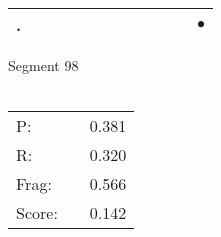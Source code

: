 \documentclass[landscape]{article}
\newcommand{\ssp}{\hspace{2pt}}
\newcommand{\mex}{\cellcolor{g}$\bullet$}
\begin{document}
\begin{tabular}{|l|p{10pt}|p{10pt}|p{10pt}|p{10pt}|p{10pt}|p{10pt}|p{10pt}|p{10pt}|p{10pt}|p{10pt}|p{10pt}|}
\hline
\ssp \cellcolor{ref10}. \ssp&\hspace{2pt}&\hspace{2pt}&\hspace{2pt}&\hspace{2pt}&\hspace{2pt}&\hspace{2pt}&\hspace{2pt}&\hspace{2pt}&\hspace{2pt}&\hspace{2pt}&\hspace{2pt}\mex\\
\hline
\end{tabular}

\vspace{6pt}
\noindent Segment 98\\\\
\noindent\begin{tabular}{lm{12pt}r}
\hline
P:&&0.381\\
R:&&0.320\\
Frag:&&0.566\\
Score:&&0.142\\
\end{tabular}

\newpage
\end{document}
